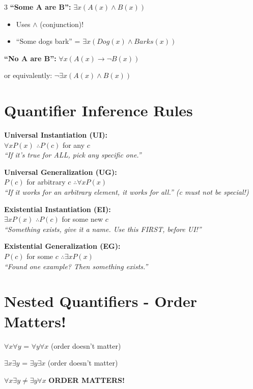 \documentclass[10pt,landscape,a4paper]{article}
\newcommand{\tand}{\wedge}
\newcommand{\tnot}{\neg}
\newcommand{\timplies}{\rightarrow}
\begin{document}
\begin{multicols}{3}
\textbf{``Some A are B'':} $\exists x (A(x) \tand B(x))$
\begin{itemize}[nosep,leftmargin=*]
\item Uses $\tand$ (conjunction)!
\item ``Some dogs bark'' = $\exists x (Dog(x) \tand Barks(x))$
\end{itemize}

\textbf{``No A are B'':} $\forall x (A(x) \timplies \tnot B(x))$

or equivalently: $\tnot \exists x (A(x) \tand B(x))$

\section*{Quantifier Inference Rules}

\textbf{Universal Instantiation (UI):}\\
$\forall x P(x)$ $\therefore P(c)$ for any $c$\\
{\small \textit{``If it's true for ALL, pick any specific one.''}}

\textbf{Universal Generalization (UG):}\\
$P(c)$ for arbitrary $c$ $\therefore \forall x P(x)$\\
{\small \textit{``If it works for an arbitrary element, it works for all.'' (c must not be special!)}}

\textbf{Existential Instantiation (EI):}\\
$\exists x P(x)$ $\therefore P(c)$ for some new $c$\\
{\small \textit{``Something exists, give it a name. Use this FIRST, before UI!''}}

\textbf{Existential Generalization (EG):}\\
$P(c)$ for some $c$ $\therefore \exists x P(x)$\\
{\small \textit{``Found one example? Then something exists.''}}

\section*{Nested Quantifiers - Order Matters!}

$\forall x \forall y$ = $\forall y \forall x$ (order doesn't matter)

$\exists x \exists y$ = $\exists y \exists x$ (order doesn't matter)

$\forall x \exists y \neq \exists y \forall x$ \textbf{ORDER MATTERS!}


\end{multicols}
\end{document}
